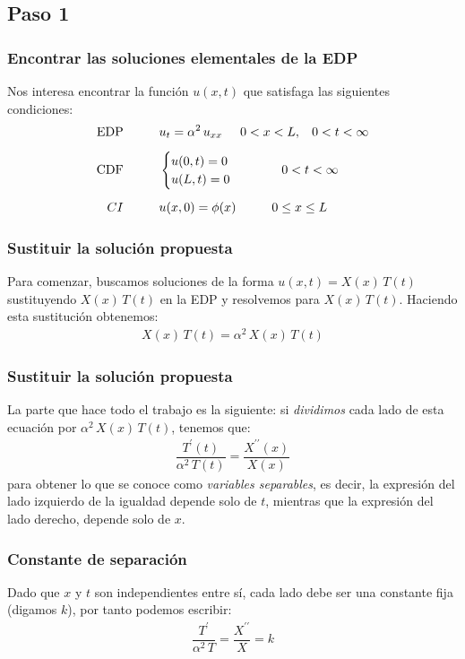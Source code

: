 \documentclass[12pt]{beamer}
\begin{document}
\subsection{Paso 1}

\begin{frame}
\frametitle{Encontrar las soluciones elementales de la EDP}
Nos interesa encontrar la función $u(x, t)$ que satisfaga las siguientes condiciones:
\begin{align*}
\mbox{EDP} \hspace{1cm} &u_{t} = \alpha^{2} \, u_{xx} \hspace{0.5cm} 0 < x < L, \hspace{0.3cm} 0 < t < \infty \\[0.5em] 
\mbox{CDF} \hspace{1cm} &\begin{cases}
    u(0, t) = 0 \\
    u(L, t) = 0
    \end{cases}
    \hspace{1cm}
    0 < t < \infty \\[0.5em]
CI \hspace{1cm} & u(x, 0) = \phi (x) \hspace{1cm} 0 \leq x \leq L
\end{align*}
\end{frame}
\begin{frame}
\frametitle{Sustituir la solución propuesta}
Para comenzar, buscamos soluciones de la forma $u (x, t) = X(x) \, T (t)$ sustituyendo $X (x) \, T (t)$ en la EDP y resolvemos para  $X (x) \, T (t)$. Haciendo esta sustitución obtenemos:
\begin{align*}
X(x) \, T (t) = \alpha^{2} \, X (x) \, T(t)
\end{align*}
\end{frame}
\begin{frame}
\frametitle{Sustituir la solución propuesta}
La parte que hace todo el trabajo es la siguiente: si \emph{dividimos} cada lado de esta ecuación por $\alpha^{2} \, X(x) \, T(t)$, tenemos que:
\begin{align*}
\dfrac{T^{\prime} (t)}{\alpha^{2} \, T(t)} = \dfrac{X^{\prime \prime} (x)}{X(x)}
\end{align*}
para obtener lo que se conoce como \emph{variables separables}, es decir, la expresión del lado izquierdo de la igualdad depende solo de $t$, mientras que la expresión del lado derecho, depende solo de $x$.
\end{frame}
\begin{frame}
\frametitle{Constante de separación}
Dado que $x$ y $t$ son independientes entre sí, cada lado debe ser una constante fija (digamos $k$),  por tanto podemos escribir:
\begin{align*}
\dfrac{T^{\prime}}{\alpha^{2} \, T} = \dfrac{X^{\prime \prime}}{X} = k
\end{align*}
\end{frame}
\end{document}
